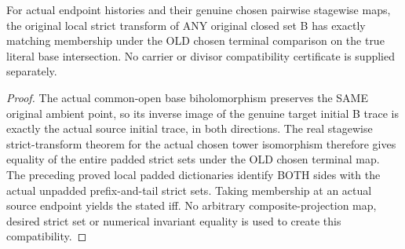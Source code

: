 \begin{theorem}
\label{hir:sharp-actual-chosen-map-strict-set-membership}
\leanok
{}
For actual endpoint histories and their genuine chosen pairwise stagewise
maps, the original local strict transform of ANY original closed set B has
exactly matching membership under the OLD chosen terminal comparison on
the true literal base intersection. No carrier or divisor compatibility
certificate is supplied separately.
\end{theorem}
\begin{proof}
The actual common-open base biholomorphism preserves the SAME original
ambient point, so its inverse image of the genuine target initial B trace
is exactly the actual source initial trace, in both directions. The real
stagewise strict-transform theorem for the actual chosen tower isomorphism
therefore gives equality of the entire padded strict sets under the OLD
chosen terminal map. The preceding proved local padded dictionaries
identify BOTH sides with the actual unpadded prefix-and-tail strict sets.
Taking membership at an actual source endpoint yields the stated iff.
No arbitrary composite-projection map, desired strict set or numerical
invariant equality is used to create this compatibility.
\end{proof}

